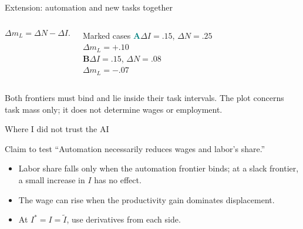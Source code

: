 \documentclass[aspectratio=169,11pt]{beamer}
\begin{document}
\begin{frame}{Extension: automation and new tasks together}
\begin{columns}[T]
\centering
{}
\[\Delta m_L=\Delta N-\Delta I.\]
\vspace{-.3em}
\begin{block}{Marked cases}
\textcolor{teal}{\textbf{A}}\quad $\Delta I=.15$, $\Delta N=.25$\\
\hspace*{1.2em}$\Delta m_L=+.10$\\[.35em]
\textcolor{orange!75!black}{\textbf{B}}\quad $\Delta I=.15$, $\Delta N=.08$\\
\hspace*{1.2em}$\Delta m_L=-.07$
\end{block}
\end{columns}
\vspace{.2em}
\footnotesize Both frontiers must bind and lie inside their task intervals. The plot concerns task mass only; it does not determine wages or employment.
\end{frame}

\begin{frame}{Where I did not trust the AI}
\begin{alertblock}{Claim to test}
``Automation necessarily reduces wages and labor's share.''
\end{alertblock}
\begin{itemize}
\item Labor share falls only when the automation frontier binds; at a slack frontier, a small increase in $I$ has no effect.
\item The wage can rise when the productivity gain dominates displacement.
\item At $I^*=I=\widetilde I$, use derivatives from each side.
\end{itemize}
\end{frame}
\end{document}
